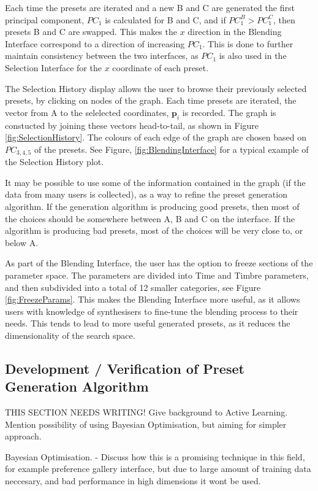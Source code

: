 \documentclass[11pt, oneside]{report}   	%
\renewcommand{\vec}[1]{\mathbf{#1}}
\begin{document}
Each time the presets are iterated and a new B and C are generated the first principal component, $PC_{1}$ is calculated for B and C, and if $PC_{1}^B > PC_{1}^C $, then presets B and C are swapped. This makes the $x$ direction in the Blending Interface correspond to a direction of increasing $PC_{1}$. This is done to further maintain consistency between the two interfaces, as $PC_{1}$ is also used in the Selection Interface for the $x$ coordinate of each preset.

The Selection History display allows the user to browse their previously selected presets, by clicking on nodes of the graph. Each time presets are iterated, the vector from A to the selelected coordinates, $\vec{p}_i$ is recorded. The graph is constucted by joining these vectors head-to-tail, as shown in Figure \ref{fig:SelectionHistory}. The colours of each edge of the graph are chosen based on $PC_{3,4,5}$ of the presets. See Figure, \ref{fig:BlendingInterface} for a typical example of the Selection History plot.

It may be possible to use some of the information contained in the graph (if the data from many users is collected), as a way to refine the preset generation algorithm. If the generation algorithm is producing good presets, then most of the choices should be somewhere between A, B and C on the interface. If the algorithm is producing bad presets, most of the choices will be very close to, or below A.

As part of the Blending Interface, the user has the option to freeze sections of the parameter space. The parameters are divided into Time and Timbre parameters, and then subdivided into a total of 12 smaller categories, see Figure \ref{fig:FreezeParams}. This makes the Blending Interface more useful, as it allows users with knowledge of synthesisers to fine-tune the blending process to their needs. This tends to lead to more useful generated presets, as it reduces the dimensionality of the search space.

\subsection{Development / Verification of Preset Generation Algorithm} \label{sec:PresetGeneration}
THIS SECTION NEEDS WRITING!
Give background to Active Learning. Mention possibility of using Bayesian Optimisation, but aiming for simpler approach. 

Bayesian Optimisation.  - 
Discuss how this is a promising technique in this field, for example preference gallery interface, but due to large amount of training data neccesary, and bad performance in high dimensions it wont be used.
\end{document}
